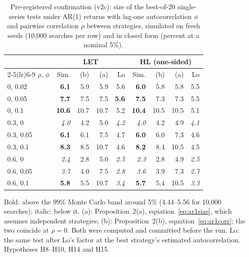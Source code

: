 \begin{table}[t]
\centering
\footnotesize
\setlength{\tabcolsep}{3.5pt}
\caption{Pre-registered confirmation (v2c): size of the best-of-20 single-series tests under AR(1) returns with lag-one autocorrelation $\phi$ and pairwise correlation $\rho$ between strategies, simulated on fresh seeds (10{,}000 searches per row) and in closed form (percent at a nominal 5\%).}
\label{tab:confirm-single}
\begin{tabular}{lrrrrrrrr}
\toprule
 & \multicolumn{4}{c}{LET} & \multicolumn{4}{c}{HL (one-sided)} \\
\cmidrule(lr){2-5}\cmidrule(lr){6-9}
$\rho$, $\phi$ & Sim. & (b) & (a) & Lo & Sim. & (b) & (a) & Lo \\
\midrule
0, 0.02 & \textbf{6.1} & 5.9 & 5.9 & 5.6 & \textbf{6.0} & 5.8 & 5.8 & 5.5 \\
0, 0.05 & \textbf{7.7} & 7.5 & 7.5 & \textbf{5.6} & \textbf{7.5} & 7.3 & 7.3 & 5.5 \\
0, 0.1 & \textbf{10.6} & 10.7 & 10.7 & 5.2 & \textbf{10.4} & 10.5 & 10.5 & 5.1 \\
0.3, 0 & \textit{4.0} & 4.2 & 5.0 & \textit{4.2} & \textit{4.0} & 4.2 & 4.9 & \textit{4.1} \\
0.3, 0.05 & \textbf{6.1} & 6.1 & 7.5 & 4.7 & \textbf{6.0} & 6.0 & 7.3 & 4.6 \\
0.3, 0.1 & \textbf{8.3} & 8.5 & 10.7 & 4.6 & \textbf{8.2} & 8.4 & 10.5 & 4.5 \\
0.6, 0 & \textit{2.4} & 2.8 & 5.0 & \textit{2.5} & \textit{2.3} & 2.8 & 4.9 & \textit{2.5} \\
0.6, 0.05 & \textit{3.7} & 4.0 & 7.5 & \textit{2.8} & \textit{3.6} & 3.9 & 7.3 & \textit{2.7} \\
0.6, 0.1 & \textbf{5.8} & 5.5 & 10.7 & \textit{3.4} & \textbf{5.7} & 5.4 & 10.5 & \textit{3.3} \\
\bottomrule
\end{tabular}
\par\smallskip\begin{minipage}{0.97\linewidth}\footnotesize Bold: above the 99\% Monte Carlo band around 5\% (4.44--5.56 for 10{,}000 searches); italic: below it. (a): Proposition~2(a), equation~\eqref{eq:ar1size}, which assumes independent strategies; (b): Proposition~2(b), equation~\eqref{eq:ar1corr}; the two coincide at $\rho=0$. Both were computed and committed before the run. Lo: the same test after Lo's factor at the best strategy's estimated autocorrelation. Hypotheses H8--H10, H14 and H15.\end{minipage}
\end{table}

